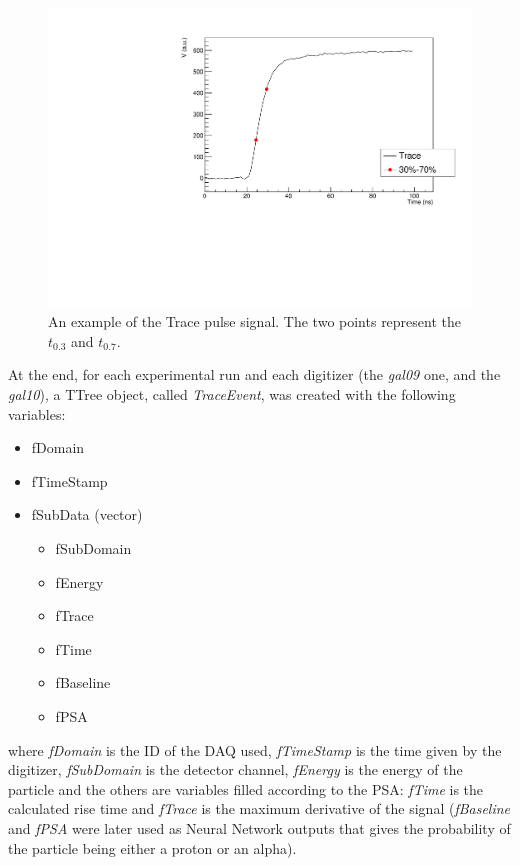 \begin{figure}[h]
  \centering
  \includegraphics[scale=.6]{img/example_pulse.pdf}
  \caption{An example of the Trace pulse signal. The two points represent the $t_{0.3}$ and $t_{0.7}$.}
  \label{pulse}
\end{figure}

At the end, for each experimental run and each digitizer (the \textit{gal09}
one, and the \textit{gal10}), a TTree object, called \textit{TraceEvent}, was created with the following variables:

\begin{itemize}
\item fDomain
\item fTimeStamp
\item fSubData (vector)
  \begin{itemize}
  \item fSubDomain
  \item fEnergy
  \item fTrace
  \item fTime
  \item fBaseline
  \item fPSA
  \end{itemize}
\end{itemize}
where \textit{fDomain} is the ID of the DAQ used, \textit{fTimeStamp} is the
time given by the digitizer, \textit{fSubDomain} is the detector channel,
\textit{fEnergy} is the energy of the particle and the others are variables
filled according to the PSA: \textit{fTime} is the calculated rise time and
\textit{fTrace} is the maximum derivative of the signal (\textit{fBaseline} and
\textit{fPSA} were later used as Neural Network outputs that gives the
probability of the particle being either a proton or an alpha).

